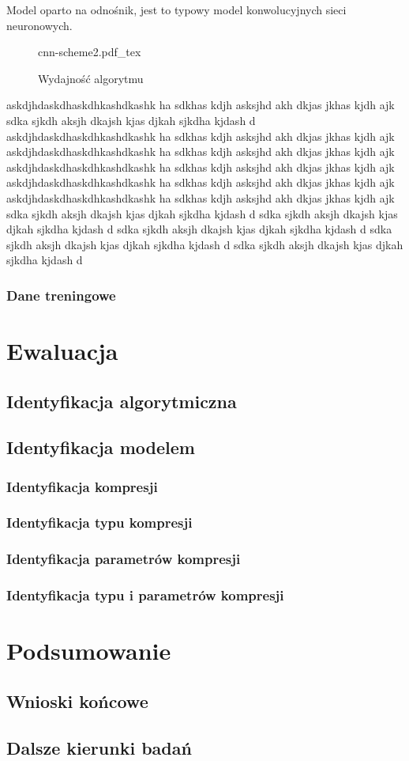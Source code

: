 \documentclass[pl,12pt]{aghdpl}
\let\Oldchapter\chapter%
\renewcommand{\chapter}{\FloatBarrier\Oldchapter}
\let\Oldsection\section%
\renewcommand{\section}{\FloatBarrier\Oldsection}
\let\Oldsubsection\subsection%
\renewcommand{\subsection}{\FloatBarrier\Oldsubsection}
\begin{document}
Model oparto na {\color{red}odnośnik}, jest to typowy model konwolucyjnych
sieci neuronowych.
\begin{figure}[!tbh]
  \centering
  \scriptsize{cnn-scheme2.pdf_tex}
  \caption{Wydajność algorytmu}
  \label{fig:cnn_scheme}
\end{figure}
askdjhdaskdhaskdhkashdkashk ha sdkhas kdjh asksjhd akh dkjas jkhas kjdh ajk
sdka sjkdh aksjh dkajsh kjas djkah sjkdha kjdash d
askdjhdaskdhaskdhkashdkashk ha sdkhas kdjh asksjhd akh dkjas jkhas kjdh ajk
askdjhdaskdhaskdhkashdkashk ha sdkhas kdjh asksjhd akh dkjas jkhas kjdh ajk
askdjhdaskdhaskdhkashdkashk ha sdkhas kdjh asksjhd akh dkjas jkhas kjdh ajk
askdjhdaskdhaskdhkashdkashk ha sdkhas kdjh asksjhd akh dkjas jkhas kjdh ajk
askdjhdaskdhaskdhkashdkashk ha sdkhas kdjh asksjhd akh dkjas jkhas kjdh ajk
sdka sjkdh aksjh dkajsh kjas djkah sjkdha kjdash d
sdka sjkdh aksjh dkajsh kjas djkah sjkdha kjdash d
sdka sjkdh aksjh dkajsh kjas djkah sjkdha kjdash d
sdka sjkdh aksjh dkajsh kjas djkah sjkdha kjdash d
sdka sjkdh aksjh dkajsh kjas djkah sjkdha kjdash d
\subsection{Dane treningowe}
\chapter{Ewaluacja}
\section{Identyfikacja algorytmiczna}
\section{Identyfikacja modelem}
\subsection{Identyfikacja kompresji}
\subsection{Identyfikacja typu kompresji}
\subsection{Identyfikacja parametrów kompresji}
\subsection{Identyfikacja typu i parametrów kompresji}
\chapter{Podsumowanie}
\section{Wnioski końcowe}
\section{Dalsze kierunki badań}

\cleardoublepage{}
\printbibliography{}
\end{document}
